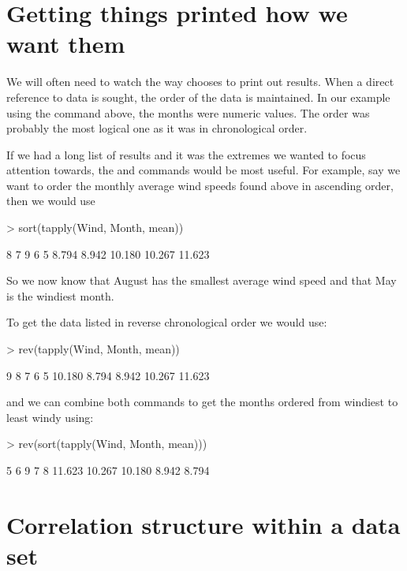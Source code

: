\section{Getting things printed how we want them} 
 
We will often need to watch the way \R{} chooses to print out results. When a direct reference to data is sought, the order of the data is maintained. In our example using the  command above, the months were numeric values. The order was probably the most logical one as it was in chronological order. 
 
If we had a long list of results and it was the extremes we wanted to focus attention towards, the  and  commands would be most useful. For example, say we want to order the monthly average wind speeds found above in ascending order, then we would use 
\begin{Schunk}
\begin{Sinput}
> sort(tapply(Wind, Month, mean)) 
\end{Sinput}
\begin{Soutput}
     8      7      9      6      5 
 8.794  8.942 10.180 10.267 11.623 
\end{Soutput}
\end{Schunk}
So we now know that August has the smallest average wind speed and that May is the windiest month. 
 
To get the data listed in reverse chronological order we would use: 
\begin{Schunk}
\begin{Sinput}
> rev(tapply(Wind, Month, mean)) 
\end{Sinput}
\begin{Soutput}
     9      8      7      6      5 
10.180  8.794  8.942 10.267 11.623 
\end{Soutput}
\end{Schunk}
and we can combine both commands to get the months ordered from windiest to least windy using: 
\begin{Schunk}
\begin{Sinput}
> rev(sort(tapply(Wind, Month, mean))) 
\end{Sinput}
\begin{Soutput}
     5      6      9      7      8 
11.623 10.267 10.180  8.942  8.794 
\end{Soutput}
\end{Schunk}
 
\section{Correlation structure within a data set} 
\label{CorrelationStructure} 
 

